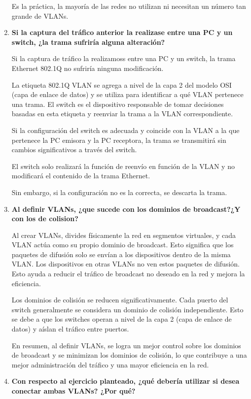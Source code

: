 \documentclass[a4paper]{article}
\begin{document}
\begin{enumerate}
Es la práctica, la mayoría de las redes no utilizan ni necesitan un número tan grande de VLANs. 

 \item \textbf{ Si la captura del tráfico anterior la realizase entre una
	PC y un switch, ¿la trama sufriría alguna alteración?}

Si la captura de tráfico la realizamoss entre una PC y un switch, la trama Ethernet 802.1Q no sufriría ninguna modificación.

La etiqueta 802.1Q VLAN se agrega a nivel de la capa 2 del modelo OSI (capa de enlace de datos) y se utiliza para identificar a qué VLAN pertenece una trama. El switch es el dispositivo responsable de tomar decisiones basadas en esta etiqueta y reenviar la trama a la VLAN correspondiente.

Si la configuración del switch es adecuada y coincide con la VLAN a la que pertenece la PC emisora y la PC receptora, la trama se transmitirá sin cambios significativos a través del switch. 

El switch solo realizará la función de reenvío en función de la VLAN y no modificará el contenido de la trama Ethernet.

Sin embargo, si la configuración no es la correcta, se descarta la trama.

\item \textbf{Al definir VLANs, ¿que sucede con los dominios de broadcast?¿Y con los de colision?}

Al crear VLANs, divides físicamente la red en segmentos virtuales, y cada VLAN actúa como su propio dominio de broadcast. Esto significa que los paquetes de difusión solo se envían a los dispositivos dentro de la misma VLAN. Los dispositivos en otras VLANs no ven estos paquetes de difusión. Esto ayuda a reducir el tráfico de broadcast no deseado en la red y mejora la eficiencia.

Los dominios de colisión se reducen significativamente. Cada puerto del switch generalmente se considera un dominio de colisión independiente. Esto se debe a que los switches operan a nivel de la capa 2 (capa de enlace de datos) y aíslan el tráfico entre puertos. 

En resumen, al definir VLANs, se logra un mejor control sobre los dominios de broadcast y se minimizan los dominios de colisión, lo que contribuye a una mejor administración del tráfico y una mayor eficiencia en la red.

\item \textbf{Con respecto al ejercicio planteado, ¿qué debería utilizar si desea conectar ambas VLANs? ¿Por qué?}


\end{enumerate}
\end{document}
